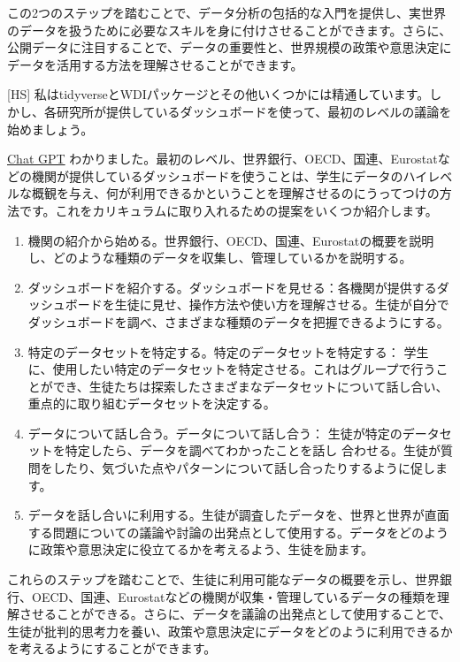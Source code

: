 \documentclass[
]{bxjsbook}
\theoremstyle{definition}
\theoremstyle{definition}
\theoremstyle{definition}
\theoremstyle{definition}
\theoremstyle{remark}
\begin{document}
この2つのステップを踏むことで、データ分析の包括的な入門を提供し、実世界のデータを扱うために必要なスキルを身に付けさせることができます。さらに、公開データに注目することで、データの重要性と、世界規模の政策や意思決定にデータを活用する方法を理解させることができます。

{[}HS{]} 私はtidyverseとWDIパッケージとその他いくつかには精通しています。しかし、各研究所が提供しているダッシュボードを使って、最初のレベルの議論を始めましょう。

\protect\hyperlink{chatgpt}{Chat GPT} わかりました。最初のレベル、世界銀行、OECD、国連、Eurostatなどの機関が提供しているダッシュボードを使うことは、学生にデータのハイレベルな概観を与え、何が利用できるかということを理解させるのにうってつけの方法です。これをカリキュラムに取り入れるための提案をいくつか紹介します。

\begin{enumerate}
\def\labelenumi{\arabic{enumi}.}
\item
  機関の紹介から始める。世界銀行、OECD、国連、Eurostatの概要を説明し、どのような種類のデータを収集し、管理しているかを説明する。
\item
  ダッシュボードを紹介する。ダッシュボードを見せる：各機関が提供するダッシュボードを生徒に見せ、操作方法や使い方を理解させる。生徒が自分でダッシュボードを調べ、さまざまな種類のデータを把握できるようにする。
\item
  特定のデータセットを特定する。特定のデータセットを特定する： 学生に、使用したい特定のデータセットを特定させる。これはグループで行うことができ、生徒たちは探索したさまざまなデータセットについて話し合い、重点的に取り組むデータセットを決定する。
\item
  データについて話し合う。データについて話し合う： 生徒が特定のデータセットを特定したら、データを調べてわかったことを話し 合わせる。生徒が質問をしたり、気づいた点やパターンについて話し合ったりするように促します。
\item
  データを話し合いに利用する。生徒が調査したデータを、世界と世界が直面する問題についての議論や討論の出発点として使用する。データをどのように政策や意思決定に役立てるかを考えるよう、生徒を励ます。
\end{enumerate}

これらのステップを踏むことで、生徒に利用可能なデータの概要を示し、世界銀行、OECD、国連、Eurostatなどの機関が収集・管理しているデータの種類を理解させることができる。さらに、データを議論の出発点として使用することで、生徒が批判的思考力を養い、政策や意思決定にデータをどのように利用できるかを考えるようにすることができます。
\end{document}
